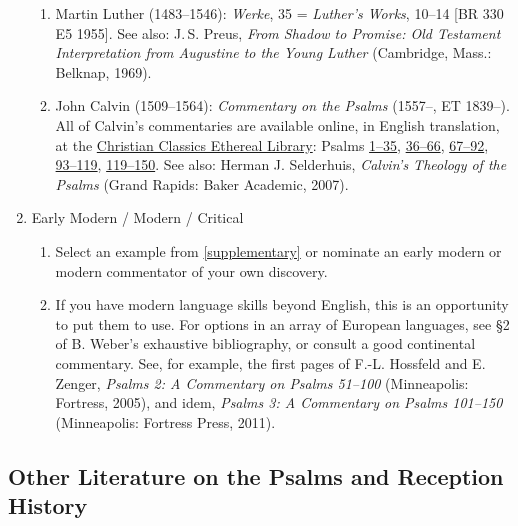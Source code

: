 \documentclass[titlepage]{article}
\begin{document}
\begin{enumerate}
\begin{enumerate}
	\item Martin Luther (1483--1546): \emph{Werke}, 35 = \emph{Luther’s Works}, 10--14 [BR 330 E5 1955]. See also: J.\,S. Preus, \emph{From Shadow to Promise: Old Testament Interpretation from Augustine to the Young Luther} (Cambridge, Mass.: Belknap, 1969).

	\item John Calvin (1509--1564): \emph{Commentary on the Psalms} (1557--, ET 1839--). All of Calvin's commentaries are available online, in English translation, at the \href{http://www.ccel.org/}{Christian Classics Ethereal Library}: Psalms \href{http://www.ccel.org/ccel/calvin/calcom08.html}{1--35}, \href{http://www.ccel.org/ccel/calvin/calcom09.html}{36--66}, \href{http://www.ccel.org/ccel/calvin/calcom10.html}{67--92}, \href{http://www.ccel.org/ccel/calvin/calcom11.html}{93--119}, \href{http://www.ccel.org/ccel/calvin/calcom12.html}{119--150}. See also: Herman J. Selderhuis, \emph{Calvin's Theology of the Psalms} (Grand Rapids: Baker Academic, 2007).

  \end{enumerate}
 \item Early Modern / Modern / Critical
  \begin{enumerate}

	\item Select an example from \autoref{supplementary} or nominate an early modern or modern commentator of your own discovery.

	\item If you have modern language skills beyond English, this is an opportunity to put them to use. For options in an array of European languages, see \S 2 of  B. Weber's exhaustive bibliography, or consult a good continental commentary. See, for example, the first pages of F.-L. Hossfeld and E. Zenger, \emph{Psalms 2: A Commentary on Psalms 51--100} (Minneapolis: Fortress, 2005), and idem, \emph{Psalms 3: A Commentary on Psalms 101--150} (Minneapolis: Fortress Press, 2011).

  \end{enumerate}

\end{enumerate}

\subsection{Other Literature on the Psalms and Reception History}
\label{horbib}
\end{document}
